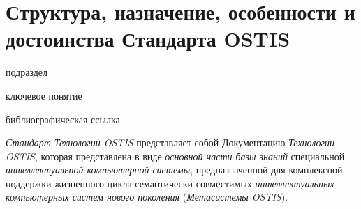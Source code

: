 \section{Структура, назначение, особенности и достоинства Стандарта OSTIS}
\label{sec_standard}

\begin{SCn}
\begin{scnrelfromlist}{подраздел}
\end{scnrelfromlist}

\bigskip

\begin{scnrelfromlist}{ключевое понятие}
\end{scnrelfromlist}

\bigskip

\begin{scnrelfromlist}{библиографическая ссылка}
\end{scnrelfromlist}
\end{SCn}

\textit{Стандарт Технологии OSTIS} представляет собой Документацию \textit{Технологии OSTIS}, которая представлена в виде \textit{основной части базы знаний} специальной \textit{интеллектуальной компьютерной системы}, предназначенной для комплексной поддержки жизненного цикла семантически совместимых \textit{интеллектуальных компьютерных систем нового поколения} (\textit{Метасистемы OSTIS}). 

